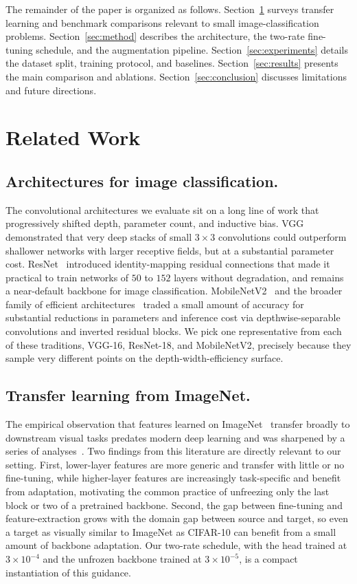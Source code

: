 \documentclass[10pt,twocolumn]{article}
\begin{document}
The remainder of the paper is organized as follows. Section~\ref{sec:related} surveys transfer learning and benchmark comparisons relevant to small image-classification problems. Section~\ref{sec:method} describes the architecture, the two-rate fine-tuning schedule, and the augmentation pipeline. Section~\ref{sec:experiments} details the dataset split, training protocol, and baselines. Section~\ref{sec:results} presents the main comparison and ablations. Section~\ref{sec:conclusion} discusses limitations and future directions.


\section{Related Work}
\label{sec:related}

\subsection*{Architectures for image classification.}
The convolutional architectures we evaluate sit on a long line of work that progressively shifted depth, parameter count, and inductive bias. VGG~\cite{simonyan2014vgg} demonstrated that very deep stacks of small $3 \times 3$ convolutions could outperform shallower networks with larger receptive fields, but at a substantial parameter cost. ResNet~\cite{he2016resnet} introduced identity-mapping residual connections that made it practical to train networks of $50$ to $152$ layers without degradation, and remains a near-default backbone for image classification. MobileNetV2~\cite{sandler2018mobilenetv2} and the broader family of efficient architectures~\cite{howard2017mobilenets,tan2019efficientnet} traded a small amount of accuracy for substantial reductions in parameters and inference cost via depthwise-separable convolutions and inverted residual blocks. We pick one representative from each of these traditions, VGG-16, ResNet-18, and MobileNetV2, precisely because they sample very different points on the depth-width-efficiency surface.

\subsection*{Transfer learning from ImageNet.}
The empirical observation that features learned on ImageNet~\cite{deng2009imagenet} transfer broadly to downstream visual tasks predates modern deep learning and was sharpened by a series of analyses~\cite{yosinski2014transferable,kornblith2019better,huh2016whatmakesimagenet}. Two findings from this literature are directly relevant to our setting. First, lower-layer features are more generic and transfer with little or no fine-tuning, while higher-layer features are increasingly task-specific and benefit from adaptation, motivating the common practice of unfreezing only the last block or two of a pretrained backbone. Second, the gap between fine-tuning and feature-extraction grows with the domain gap between source and target, so even a target as visually similar to ImageNet as CIFAR-10 can benefit from a small amount of backbone adaptation. Our two-rate schedule, with the head trained at $3 \times 10^{-4}$ and the unfrozen backbone trained at $3 \times 10^{-5}$, is a compact instantiation of this guidance.
\end{document}
